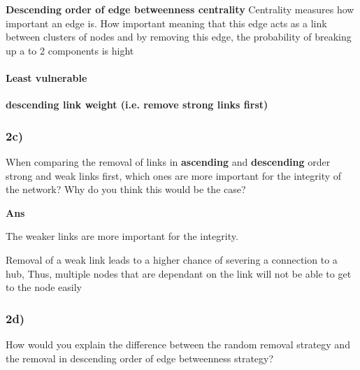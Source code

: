 \documentclass[11pt]{article}
\begin{document}
\textbf{Descending order of edge betweenness centrality} Centrality
measures how important an edge is. How important meaning that this edge
acts as a link between clusters of nodes and by removing this edge, the
probability of breaking up a to 2 components is hight

\paragraph{Least vulnerable}\label{least-vulnerable}

\textbf{descending link weight (i.e. remove strong links first)}

    \subsubsection{2c)}\label{c}

When comparing the removal of links in \textbf{ascending} and
\textbf{descending} order strong and weak links first, which ones are
more important for the integrity of the network? Why do you think this
would be the case?

    \textbf{Ans}

The weaker links are more important for the integrity.

Removal of a weak link leads to a higher chance of severing a connection
to a hub, Thus, multiple nodes that are dependant on the link will not
be able to get to the node easily

    \subsubsection{2d)}\label{d}

How would you explain the difference between the random removal strategy
and the removal in descending order of edge betweenness strategy?


    
    
    
    
\end{document}
